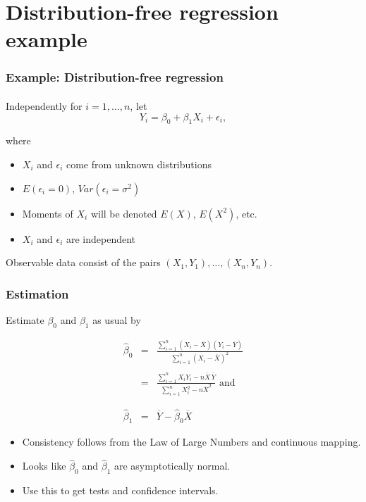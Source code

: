 \documentclass[serif]{beamer} %
\begin{document}
\section{Distribution-free regression example}

\begin{frame}
\frametitle{Example: Distribution-free regression}
\framesubtitle{} 
Independently for $i=1, \ldots, n$, let
\begin{displaymath}
    Y_i = \beta_0 + \beta_1 X_i + \epsilon_i,
\end{displaymath}

where 

\begin{itemize}
     \item $X_i$ and $\epsilon_i$ come from unknown distributions
     \item $E(\epsilon_i=0)$, $Var(\epsilon_i=\sigma^2)$
     \item Moments of $X_i$ will be denoted $E(X)$, $E(X^2)$, etc.
     \item $X_i$ and $\epsilon_i$ are independent
\end{itemize}

\vspace{10mm}
Observable data consist of the pairs $(X_1,Y_1), \ldots, (X_n,Y_n)$.
\end{frame}

\begin{frame}
\frametitle{Estimation}
Estimate $\beta_0$ and $\beta_1$ as usual by

\begin{eqnarray*}
    \widehat{\beta}_0 
       & = & \frac{\sum_{i=1}^n(X_i-\overline{X})(Y_i-\overline{Y})}
                  {\sum_{i=1}^n(X_i-\overline{X})^2} \\ \\
       & = & \frac{\sum_{i=1}^n X_i Y_i - n \overline{X} \, \overline{Y}}
                  {\sum_{i=1}^n X_i^2 - n \overline{X}^2} \mbox{ and} \\ \\ \\
    \widehat{\beta}_1 & = & \overline{Y} -  \widehat{\beta}_0 \overline{X}
\end{eqnarray*} 

\begin{itemize}
     \item Consistency follows from the Law of Large Numbers and continuous mapping.
     \item Looks like $\widehat{\beta}_0$ and $\widehat{\beta}_1$ are asymptotically normal.
     \item Use this to get tests and confidence intervals.
\end{itemize}
\end{frame}
\end{document}

